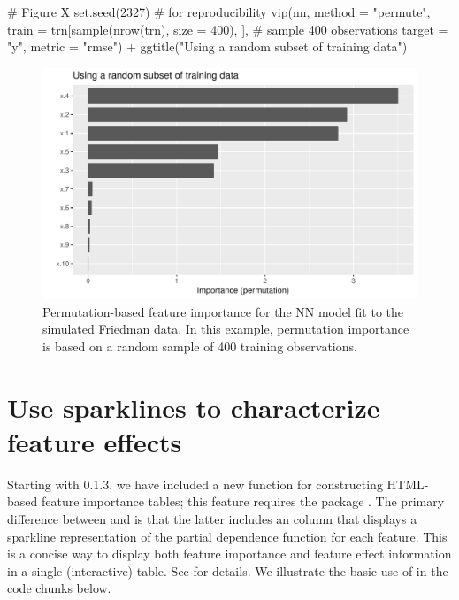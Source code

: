 \begin{example}
# Figure X
set.seed(2327)  # for reproducibility
vip(nn, method = "permute", 
    train = trn[sample(nrow(trn), size = 400), ],  # sample 400 observations
    target = "y", metric = "rmse") +
  ggtitle("Using a random subset of training data")
\end{example}

\begin{figure}[!htb]
  \centering
  \includegraphics[width=1\linewidth]{figures/vip-permute-nn-sample}
  \caption{Permutation-based feature importance for the NN model fit to the simulated Friedman data. In this example, permutation importance is based on a random sample of 400 training observations.}
  \label{fig:vip-nn-mae}
\end{figure}


\section{Use sparklines to characterize feature effects}

Starting with  0.1.3, we have included a new function  for constructing HTML-based feature importance tables; this feature requires the  package \citep{DT-pkg}. The primary difference between  and  is that the latter includes an  column that displays a sparkline representation of the partial dependence function for each feature. This is a concise way to display both feature importance and feature effect information in a single (interactive) table. See  for details. We illustrate the basic use of  in the code chunks below.

